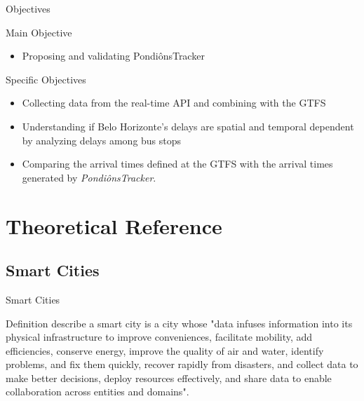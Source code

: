 \documentclass[xcolor=dvipsnames,table]{beamer}
\begin{document}
\begin{frame}{Objectives}
        \begin{block}{Main Objective}
                \begin{itemize}
                        \item Proposing and validating PondiônsTracker
                \end{itemize}
        \end{block}
        \begin{block}{Specific Objectives}
                \begin{itemize}
                        \item Collecting data from the real-time API and combining with the GTFS
                        \item Understanding if Belo Horizonte's delays are spatial and temporal dependent by analyzing delays among bus stops
                        \item Comparing the arrival times defined at the GTFS with the arrival times generated by \textit{PondiônsTracker}.
                \end{itemize}
        \end{block}
\end{frame}

\section{Theoretical Reference}
\subsection{Smart Cities}
\begin{frame}{Smart Cities}
        \begin{block}{Definition}
                \citealt{pardo2011} describe
                a smart city is a city whose "data infuses information into its physical infrastructure to improve
                conveniences, facilitate mobility, add efficiencies, conserve energy,
                improve the quality of air and water, identify problems, and fix them
                quickly, recover rapidly from disasters, and collect data to make better
                decisions, deploy resources effectively, and share data to enable
                collaboration across entities and domains".
        \end{block}
\end{frame}
\end{document}

